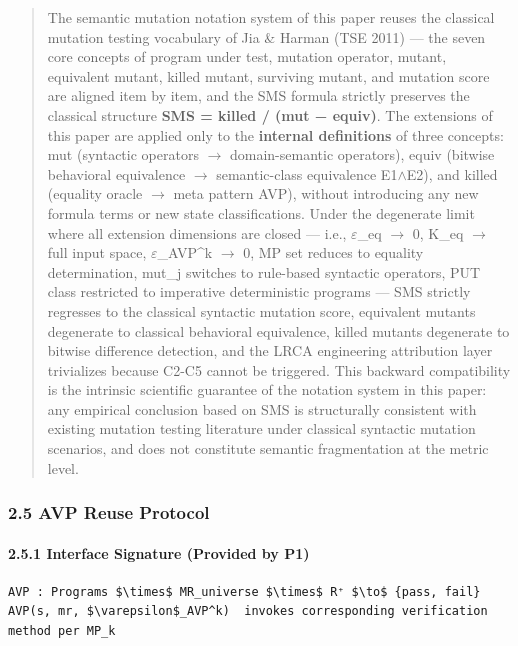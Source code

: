 \documentclass[review,12pt,authoryear]{elsarticle}
\begin{document}
\begin{quote}
The semantic mutation notation system of this paper reuses the classical
mutation testing vocabulary of Jia \& Harman (TSE 2011) --- the seven
core concepts of program under test, mutation operator, mutant,
equivalent mutant, killed mutant, surviving mutant, and mutation score
are aligned item by item, and the SMS formula strictly preserves the
classical structure \textbf{SMS = \textbar killed\textbar{} /
(\textbar mut\textbar{} − \textbar equiv\textbar)}. The extensions of
this paper are applied only to the \textbf{internal definitions} of
three concepts: mut (syntactic operators $\to$ domain-semantic operators),
equiv (bitwise behavioral equivalence $\to$ semantic-class equivalence
E1$\wedge$E2), and killed (equality oracle $\to$ meta pattern AVP), without
introducing any new formula terms or new state classifications. Under
the degenerate limit where all extension dimensions are closed --- i.e.,
$\varepsilon$\_eq $\to$ 0, K\_eq $\to$ full input space, $\varepsilon$\_AVP\^{}k $\to$ 0, MP set reduces to
equality determination, mut\_j switches to rule-based syntactic
operators, PUT class restricted to imperative deterministic programs ---
SMS strictly regresses to the classical syntactic mutation score,
equivalent mutants degenerate to classical behavioral equivalence,
killed mutants degenerate to bitwise difference detection, and the LRCA
engineering attribution layer trivializes because C2-C5 cannot be
triggered. This backward compatibility is the intrinsic scientific
guarantee of the notation system in this paper: any empirical conclusion
based on SMS is structurally consistent with existing mutation testing
literature under classical syntactic mutation scenarios, and does not
constitute semantic fragmentation at the metric level.
\end{quote}

\subsubsection{2.5 AVP Reuse Protocol}\label{avp-reuse-protocol}

\paragraph{2.5.1 Interface Signature (Provided by
P1)}\label{interface-signature-provided-by-p1}

\begin{verbatim}
AVP : Programs $\times$ MR_universe $\times$ R⁺ $\to$ {pass, fail}
AVP(s, mr, $\varepsilon$_AVP^k)  invokes corresponding verification method per MP_k
\end{verbatim}
\end{document}
